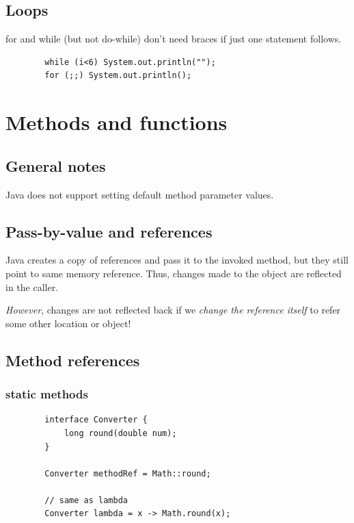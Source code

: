 \documentclass{scrartcl}
\begin{document}
\subsection{Loops}

    for and while (but not do-while) don't need braces if just one statement follows.

    \begin{lstlisting}
        while (i<6) System.out.println("");
        for (;;) System.out.println();
    \end{lstlisting}

\section{Methods and functions}
\subsection{General notes}

    Java does not support setting default method parameter values.

\subsection{Pass-by-value and references}

    Java creates a copy of references and pass it to the invoked method,     but they still point to same memory reference. Thus, changes made to the object are reflected in the caller.

    \textit{However}, changes are not reflected back if we \textit{change the reference itself} to refer some other location or object!


\subsection{Method references}

    \subsubsection{static methods}

    \begin{lstlisting}
        interface Converter {
            long round(double num);
        }

        Converter methodRef = Math::round;

        // same as lambda
        Converter lambda = x -> Math.round(x);
    \end{lstlisting}
\end{document}
